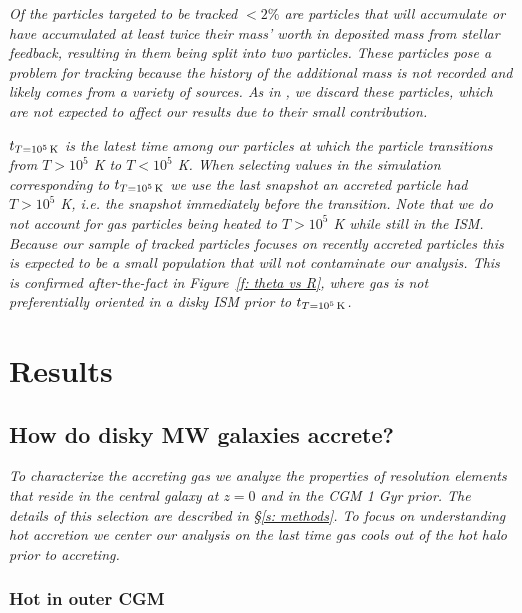 \documentclass[fleqn,usenatbib]{mnras}
\newcommand{\tcon}{t_{T=10^5\,{\rm K}}}
\begin{document}
\textit{
Of the particles targeted to be tracked $<2\%$ are particles that will accumulate or have accumulated at least twice their mass' worth in deposited mass from stellar feedback, resulting in them being split into two particles.
These particles pose a problem for tracking because the history of the additional mass is not recorded and likely comes from a variety of sources.
As in \cite{Hafen2019}, we discard these particles, which are not expected to affect our results due to their small contribution.
}

\textit{
$\tcon$ is the latest time among our particles at which the particle transitions from $T > 10^5$ K to $T< 10^5$ K.
When selecting values in the simulation corresponding to $\tcon$ we use the last snapshot an accreted particle had $T > 10^5$ K, i.e. the snapshot immediately before the transition.
Note that we do not account for gas particles being heated to $T > 10^5$ K while still in the ISM.
Because our sample of tracked particles focuses on recently accreted particles this is expected to be a small population that will not contaminate our analysis.
This is confirmed after-the-fact in Figure~\ref{f: theta vs R}, where gas is not preferentially oriented in a disky ISM prior to $\tcon$.
}

\section{Results}
\label{s: results}


\subsection{How do disky MW galaxies accrete?}
\label{s: characteristics}

\textit{
To characterize the accreting gas we analyze the properties of resolution elements that reside in the central galaxy at $z=0$ and in the CGM 1 Gyr prior.
The details of this selection are described in \S\ref{s: methods}.
To focus on understanding hot accretion we center our analysis on the last time gas cools out of the hot halo prior to accreting.
}


\subsubsection{Hot in outer CGM}
\label{s: inflowing gas phase}
\end{document}
